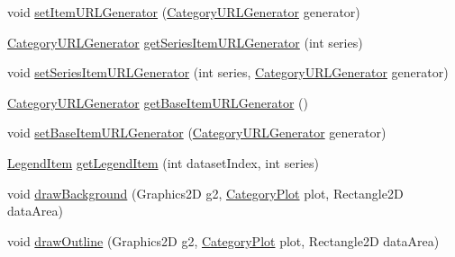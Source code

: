 \begin{DoxyCompactItemize}
\item 
void \mbox{\hyperlink{interfaceorg_1_1jfree_1_1chart_1_1renderer_1_1category_1_1_category_item_renderer_ab208309306871c44b6ea1d85382d534e}{set\+Item\+U\+R\+L\+Generator}} (\mbox{\hyperlink{interfaceorg_1_1jfree_1_1chart_1_1urls_1_1_category_u_r_l_generator}{Category\+U\+R\+L\+Generator}} generator)
\item 
\mbox{\hyperlink{interfaceorg_1_1jfree_1_1chart_1_1urls_1_1_category_u_r_l_generator}{Category\+U\+R\+L\+Generator}} \mbox{\hyperlink{interfaceorg_1_1jfree_1_1chart_1_1renderer_1_1category_1_1_category_item_renderer_a64d80a830a7a1e182659b29054f9c4fb}{get\+Series\+Item\+U\+R\+L\+Generator}} (int series)
\item 
void \mbox{\hyperlink{interfaceorg_1_1jfree_1_1chart_1_1renderer_1_1category_1_1_category_item_renderer_aff7f034084c4edb10cacc73c96a6a311}{set\+Series\+Item\+U\+R\+L\+Generator}} (int series, \mbox{\hyperlink{interfaceorg_1_1jfree_1_1chart_1_1urls_1_1_category_u_r_l_generator}{Category\+U\+R\+L\+Generator}} generator)
\item 
\mbox{\hyperlink{interfaceorg_1_1jfree_1_1chart_1_1urls_1_1_category_u_r_l_generator}{Category\+U\+R\+L\+Generator}} \mbox{\hyperlink{interfaceorg_1_1jfree_1_1chart_1_1renderer_1_1category_1_1_category_item_renderer_a87008cf9d5718483e89d13b93521d1c2}{get\+Base\+Item\+U\+R\+L\+Generator}} ()
\item 
void \mbox{\hyperlink{interfaceorg_1_1jfree_1_1chart_1_1renderer_1_1category_1_1_category_item_renderer_a4400119df0df9fa629f6b0b630da4bb5}{set\+Base\+Item\+U\+R\+L\+Generator}} (\mbox{\hyperlink{interfaceorg_1_1jfree_1_1chart_1_1urls_1_1_category_u_r_l_generator}{Category\+U\+R\+L\+Generator}} generator)
\item 
\mbox{\hyperlink{classorg_1_1jfree_1_1chart_1_1_legend_item}{Legend\+Item}} \mbox{\hyperlink{interfaceorg_1_1jfree_1_1chart_1_1renderer_1_1category_1_1_category_item_renderer_ab9269f34c8b4859211e4f4472636c93c}{get\+Legend\+Item}} (int dataset\+Index, int series)
\item 
void \mbox{\hyperlink{interfaceorg_1_1jfree_1_1chart_1_1renderer_1_1category_1_1_category_item_renderer_ad6613141eeeab27460f2edd691d3c887}{draw\+Background}} (Graphics2D g2, \mbox{\hyperlink{classorg_1_1jfree_1_1chart_1_1plot_1_1_category_plot}{Category\+Plot}} plot, Rectangle2D data\+Area)
\item 
void \mbox{\hyperlink{interfaceorg_1_1jfree_1_1chart_1_1renderer_1_1category_1_1_category_item_renderer_a160180894469dfa5ee6fe825dc5d35e3}{draw\+Outline}} (Graphics2D g2, \mbox{\hyperlink{classorg_1_1jfree_1_1chart_1_1plot_1_1_category_plot}{Category\+Plot}} plot, Rectangle2D data\+Area)

\end{DoxyCompactItemize}

